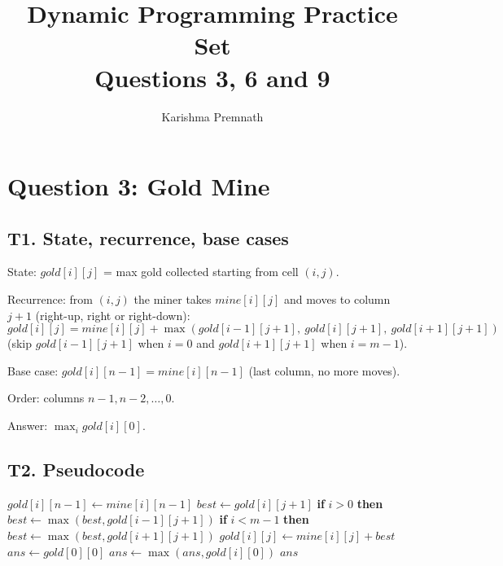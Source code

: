 \documentclass[11pt]{article}
\title{Dynamic Programming Practice Set\\Questions 3, 6 and 9}
\author{Karishma Premnath}
\date{}
\newcommand{\IfThen}[2]{\textbf{if} #1 \textbf{then} #2}
\begin{document}
\maketitle

\section*{Question 3: Gold Mine}

\subsection*{T1. State, recurrence, base cases}

\noindent State: $gold[i][j]$ = max gold collected starting from cell $(i,j)$.

\medskip
\noindent Recurrence: from $(i,j)$ the miner takes $mine[i][j]$ and moves to column $j+1$ (right-up, right or right-down):
\[
gold[i][j] = mine[i][j] + \max(gold[i-1][j+1],\ gold[i][j+1],\ gold[i+1][j+1])
\]
(skip $gold[i-1][j+1]$ when $i = 0$ and $gold[i+1][j+1]$ when $i = m-1$).

\medskip
\noindent Base case: $gold[i][n-1] = mine[i][n-1]$ (last column, no more moves).

\medskip
\noindent Order: columns $n-1, n-2, \dots, 0$.

\medskip
\noindent Answer: $\max_i gold[i][0]$.

\subsection*{T2. Pseudocode}

\begin{algorithm}[H]
\caption{GoldMine$(mine, m, n)$}
\begin{algorithmic}[1]
  \State $gold[i][n-1] \gets mine[i][n-1]$
\EndFor
{}
    \State $best \gets gold[i][j+1]$
    \State \IfThen{$i > 0$}{$best \gets \max(best, gold[i-1][j+1])$}
    \State \IfThen{$i < m-1$}{$best \gets \max(best, gold[i+1][j+1])$}
    \State $gold[i][j] \gets mine[i][j] + best$
  \EndFor
\EndFor
\State $ans \gets gold[0][0]$
  \State $ans \gets \max(ans, gold[i][0])$
\EndFor
\State \Return $ans$
\end{algorithmic}
\end{algorithm}
\end{document}
